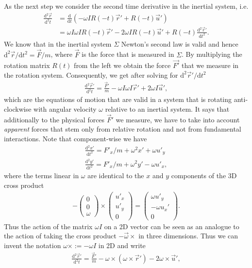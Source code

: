 \documentclass[10pt,a4paper]{article}
\renewcommand{\d}{\mathrm{d}}
\begin{document}
As the next step we consider the second time derivative in the inertial system, i.e.
%
\begin{align}
\frac{\d^2 \vec{r}}{\d^2 t} & = \frac{\d}{\d t} \left( - \omega I  R(-t) \vec{r}' + R(-t) \vec{u}' \right) \\
&= \omega I \omega I R(-t) \vec{r}' - 2 \omega I R(-t) \vec{u}' + R(-t)  \frac{\d^2 \vec{r}'}{\d t^2} .
\end{align}
%
We know that in the inertial system $\Sigma$ Newton's second law is valid and hence ${\d^2 \vec{r}}/{\d t^2}=\vec{F}/m$, where $\vec{F}$ is the force that is measured in $\Sigma$.
%
By multiplying the rotation matrix $R(t)$ from the left we obtain the force $\vec{F'}$ that we measure in the rotation system.
%
Consequently, we get after solving for ${\d^2 \vec{r}'}/{\d t^2}$ 
%
\begin{align}
\boxed{
\frac{\d^2 \vec{r}'}{\d^2 t} = \frac{\vec{F}'}{m}-  \omega I \omega I \vec{r}' + 2  \omega I \vec{u}' ,
}
\end{align}
%
which are the equations of motion that are valid in a system that is rotating anti-clockwise with angular velocity $\omega$ relative to an inertial system.
%
It says that additionally to the physical forces $\vec{F}'$ we measure, we have to take into account \textit{apparent} forces that stem only from relative rotation and not from fundamental interactions.
%
Note that component-wise we have
%
\begin{align}
\frac{\d^2 x'}{\d t^2} = F'_x/m + \omega^2 x' +  \omega u'_y \\
\frac{\d^2 y'}{\d t^2} = F'_x/m + \omega^2 y' -\omega u'_x,
\end{align}
%
where the terms linear in $\omega$ are identical to the $x$ and $y$ components of the 3D cross product
%
\begin{align}
-\begin{pmatrix}
0 \\
0 \\
\omega
\end{pmatrix} \times
\begin{pmatrix}
u'_x \\
u'_y \\
0
\end{pmatrix} = 
\begin{pmatrix}
\omega u'_y \\
-\omega u_x' \\
0
\end{pmatrix}.
\end{align}
%
Thus the action of the matrix $\omega I$ on a 2D vector can be seen as an analogue to the action of taking the cross product $-\vec{\omega} \times$ in three dimensions.
%
Thus we can invent the notation $\omega \times := -\omega I$ in 2D and write 
%
\begin{align}
\boxed{
\frac{\d^2 \vec{r}'}{\d^2 t} = \frac{\vec{F}'}{m} - \omega \times (\omega \times \vec{r}') - 2  \omega \times \vec{u}' ,
}
\end{align}
\end{document}
